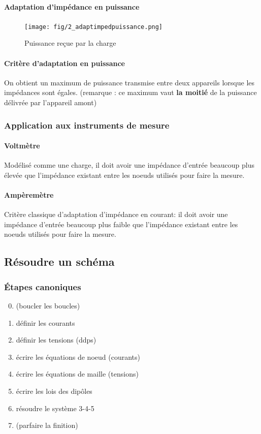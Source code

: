 \documentclass[a4paper]{article}
\begin{document}
    \paragraph{Adaptation d'impédance en puissance}
    \begin{figure}[H]
        \begin{center}
            \texttt{[image: fig/2\_adaptimpedpuissance.png]}
            \caption{Puissance reçue par la charge}
            \label{fig:2_adaptimpedpuissance}
        \end{center}
    \end{figure}

    \paragraph{Critère d'adaptation en puissance} On obtient un maximum de puissance
    transmise entre deux appareils lorsque les impédances sont égales. (remarque :
    ce maximum vaut \textbf{la moitié} de la puissance délivrée par l'appareil amont)

    \subsubsection{Application aux instruments de mesure}
    \paragraph{Voltmètre} Modélisé comme une charge, il doit avoir une
    impédance d'entrée beaucoup plus élevée que l'impédance existant entre les 
    noeuds utilisés pour faire la mesure.

    \paragraph{Ampèremètre} Critère classique d'adaptation d'impédance en courant:
    il doit avoir une impédance d'entrée beaucoup plus faible que l'impédance
    existant entre les noeuds utilisés pour faire la mesure.


    \subsection{Résoudre un schéma}
    \subsubsection{\'Etapes canoniques}
    \begin{enumerate}
        \setcounter{enumi}{-1}
        \item (boucler les boucles)
        \item définir les courants
        \item définir les tensions (ddps)
        \item écrire les équations de noeud (courants)
        \item écrire les équations de maille (tensions)
        \item écrire les lois des dipôles
        \item résoudre le système 3-4-5
        \item (parfaire la finition)
    \end{enumerate}
\end{document}
